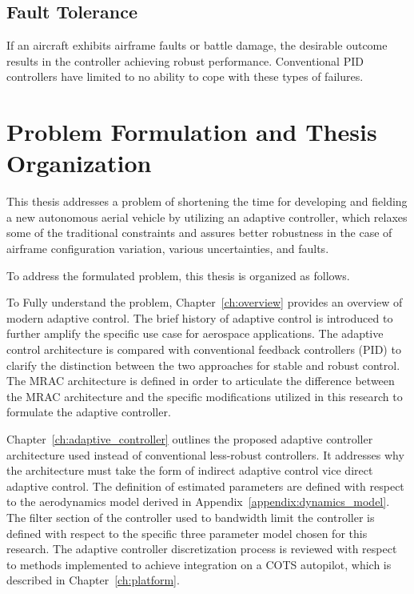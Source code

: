 \subsection{Fault Tolerance}
If an aircraft exhibits airframe faults or battle damage, the desirable outcome results in the controller achieving robust performance.  Conventional \ac{PID} controllers have limited to no ability to cope with these types of failures.

\section{Problem Formulation and Thesis Organization}

This thesis addresses a problem of shortening the time for developing and fielding a new autonomous aerial vehicle by utilizing an adaptive controller, which relaxes some of the traditional constraints and assures better robustness in the case of airframe configuration variation, various uncertainties, and faults.  

To address the formulated problem, this thesis is organized as follows.

To Fully understand the problem, Chapter~\ref{ch:overview} provides an overview of modern adaptive control.  The brief history of adaptive control is introduced to further amplify the specific use case for aerospace applications.  The adaptive control architecture is compared with conventional feedback controllers (\ac{PID}) to clarify the distinction between the two approaches for stable and robust control.  The \ac{MRAC} architecture is defined in order to articulate the difference between the \ac{MRAC} architecture and the specific modifications utilized in this research to formulate the \Lone adaptive controller.

Chapter~\ref{ch:adaptive_controller} outlines the proposed adaptive controller architecture used instead of conventional less-robust controllers.  It addresses why the architecture must take the form of indirect adaptive control vice direct adaptive control.  The definition of estimated parameters are defined with respect to the aerodynamics model derived in Appendix~\ref{appendix:dynamics_model}.  The filter section of the controller used to bandwidth limit the controller is defined with respect to the specific three parameter model chosen for this research.  The \Lone adaptive controller discretization process is reviewed with respect to methods implemented to achieve integration on a \ac{COTS} autopilot, which is described in Chapter~\ref{ch:platform}.

